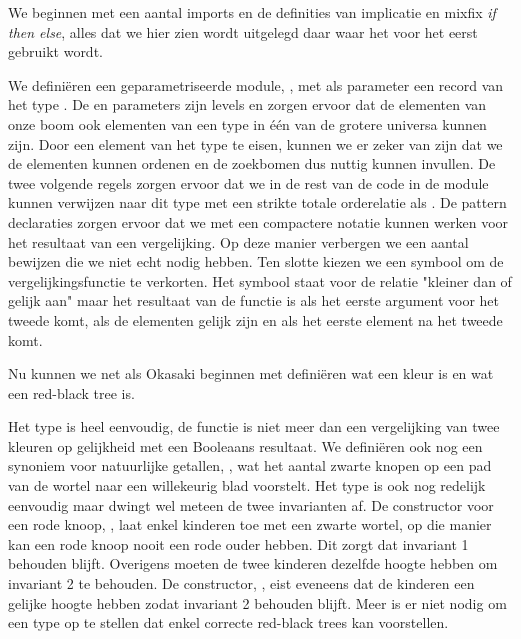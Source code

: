 
We beginnen met een aantal imports en de definities van implicatie en mixfix
\emph{if then else}, alles dat we hier zien wordt uitgelegd daar waar het voor
het eerst gebruikt wordt.


We definiëren een geparametriseerde module, , met als parameter
een record van het type . De  en 
parameters zijn levels en zorgen ervoor dat de elementen van onze boom ook
elementen van een type in één van de grotere universa kunnen zijn. Door een
element van het type  te eisen, kunnen we er zeker van
zijn dat we de elementen kunnen ordenen en de zoekbomen dus nuttig kunnen
invullen. De twee volgende regels zorgen ervoor dat we in de rest van de code
in de module kunnen verwijzen naar dit type met een strikte totale orderelatie
als . De pattern declaraties zorgen ervoor dat we met een compactere
notatie kunnen werken voor het resultaat van een vergelijking. Op deze manier
verbergen we een aantal bewijzen die we niet echt nodig hebben. Ten slotte
kiezen we een symbool om de vergelijkingsfunctie te verkorten. Het symbool
staat voor de relatie "kleiner dan of gelijk aan" maar het resultaat van de
functie is  als het eerste argument voor het tweede komt, 
als de elementen gelijk zijn en  als het eerste element na het tweede
komt.

Nu kunnen we net als Okasaki beginnen met definiëren wat een kleur is en wat een
red-black tree is.


Het type  is heel eenvoudig, de functie  is niet meer
dan een vergelijking van twee kleuren op gelijkheid met een Booleaans
resultaat. We definiëren ook nog een synoniem voor natuurlijke getallen,
, wat het aantal zwarte knopen op een pad van de wortel naar een
willekeurig blad voorstelt. Het type  is ook nog redelijk eenvoudig
maar dwingt wel meteen de twee invarianten af. De constructor voor een rode
knoop, , laat enkel kinderen toe met een zwarte wortel, op die manier
kan een rode knoop nooit een rode ouder hebben. Dit zorgt dat invariant 1
behouden blijft. Overigens moeten de twee kinderen dezelfde hoogte hebben om
invariant 2 te behouden. De constructor, , eist eveneens dat de
kinderen een gelijke hoogte hebben zodat invariant 2 behouden blijft. Meer is
er niet nodig om een type op te stellen dat enkel correcte red-black trees kan
voorstellen.

